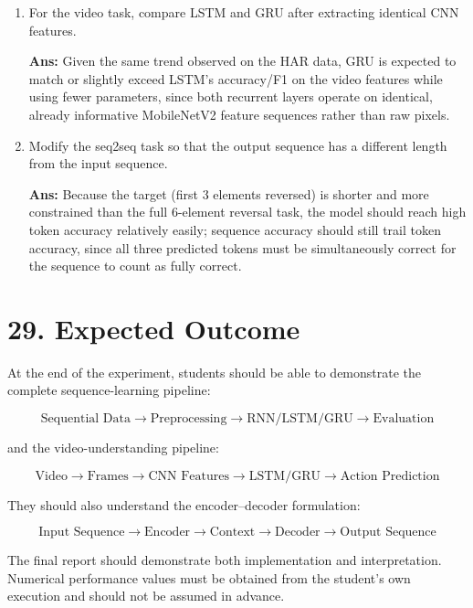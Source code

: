 \documentclass[10pt]{article}
\begin{document}
\begin{enumerate}
\item For the video task, compare LSTM and GRU after extracting identical
CNN features.

\textbf{Ans:} Given the same trend observed on the HAR data,
GRU is expected to match or slightly exceed LSTM's accuracy/F1 on the video
features while using fewer parameters, since both recurrent layers operate
on identical, already informative MobileNetV2 feature sequences rather than
raw pixels.

\item Modify the seq2seq task so that the output sequence has a different
length from the input sequence.

\textbf{Ans:} Because the target (first 3 elements reversed)
is shorter and more constrained than the full 6-element reversal task, the
model should reach high token accuracy relatively easily; sequence accuracy
should still trail token accuracy, since all three predicted tokens must be
simultaneously correct for the sequence to count as fully correct.

\end{enumerate}

\section*{29. Expected Outcome}

At the end of the experiment, students should be able to demonstrate the
complete sequence-learning pipeline:

\[
\boxed{
\text{Sequential Data}
\rightarrow
\text{Preprocessing}
\rightarrow
\text{RNN/LSTM/GRU}
\rightarrow
\text{Evaluation}
}
\]

and the video-understanding pipeline:

\[
\boxed{
\text{Video}
\rightarrow
\text{Frames}
\rightarrow
\text{CNN Features}
\rightarrow
\text{LSTM/GRU}
\rightarrow
\text{Action Prediction}
}
\]

They should also understand the encoder--decoder formulation:

\[
\boxed{
\text{Input Sequence}
\rightarrow
\text{Encoder}
\rightarrow
\text{Context}
\rightarrow
\text{Decoder}
\rightarrow
\text{Output Sequence}
}
\]

The final report should demonstrate both implementation and interpretation.
Numerical performance values must be obtained from the student's own
execution and should not be assumed in advance.
\end{document}
